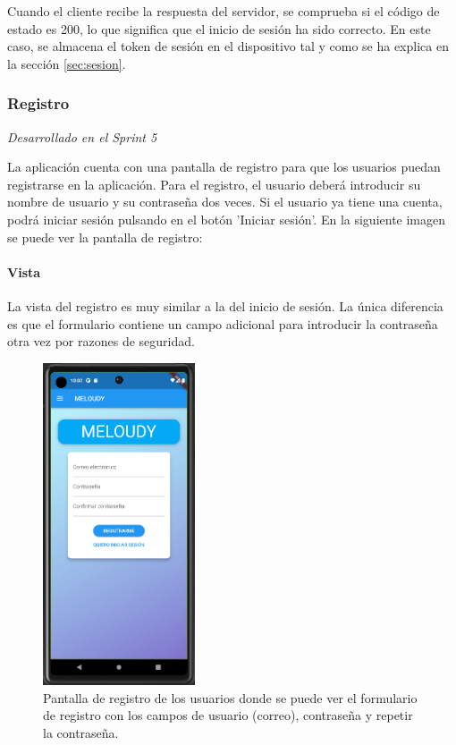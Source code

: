Cuando el cliente recibe la respuesta del servidor, se comprueba si el código de estado es 200, lo que significa que el inicio de sesión ha sido correcto.
 En este caso, se almacena el token de sesión en el dispositivo tal y como se ha explica en la sección \ref{sec:sesion}. 

 \newpage
\subsubsection{Registro}
\textit{Desarrollado en el Sprint 5}
\label{sec:register}

La aplicación cuenta con una pantalla de registro para que los usuarios puedan registrarse en la aplicación. 
Para el registro, el usuario deberá introducir su nombre de usuario y su contraseña dos veces. Si el usuario ya tiene una cuenta,
 podrá iniciar sesión pulsando en el botón 'Iniciar sesión'. En la siguiente imagen se puede ver la pantalla de registro:



\paragraph*{Vista}
La vista del registro es muy similar a la del inicio de sesión. La única diferencia es que el formulario contiene 
un campo adicional para introducir la contraseña otra vez por razones de seguridad.

\begin{figure}[H]
  \centering
  \includegraphics[width=0.4\textwidth]{imagenes/c7/registro.png}
  \caption{Pantalla de registro de los usuarios donde se puede ver el formulario de registro con los campos de usuario (correo), contraseña y repetir la contraseña.}
  \label{fig:register}
\end{figure}


